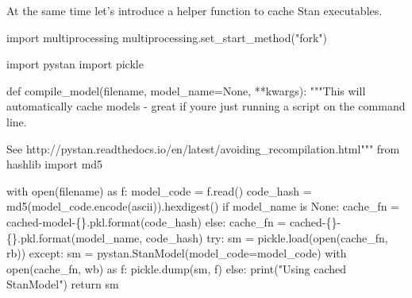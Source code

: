 \documentclass[
  letterpaper,
  DIV=11,
  numbers=noendperiod]{scrartcl}
\newenvironment{Shaded}{\begin{snugshade}}{\end{snugshade}}
\newcommand{\BuiltInTok}[1]{\textcolor[rgb]{0.00,0.23,0.31}{#1}}
\newcommand{\CommentTok}[1]{\textcolor[rgb]{0.37,0.37,0.37}{#1}}
\newcommand{\ControlFlowTok}[1]{\textcolor[rgb]{0.00,0.23,0.31}{#1}}
\newcommand{\ImportTok}[1]{\textcolor[rgb]{0.00,0.46,0.62}{#1}}
\newcommand{\KeywordTok}[1]{\textcolor[rgb]{0.00,0.23,0.31}{#1}}
\newcommand{\NormalTok}[1]{\textcolor[rgb]{0.00,0.23,0.31}{#1}}
\newcommand{\OperatorTok}[1]{\textcolor[rgb]{0.37,0.37,0.37}{#1}}
\newcommand{\SpecialCharTok}[1]{\textcolor[rgb]{0.37,0.37,0.37}{#1}}
\newcommand{\StringTok}[1]{\textcolor[rgb]{0.13,0.47,0.30}{#1}}
\newcommand{\VariableTok}[1]{\textcolor[rgb]{0.07,0.07,0.07}{#1}}
\begin{document}
At the same time let's introduce a helper function to cache Stan
executables.

\begin{Shaded}
\begin{Highlighting}[]
\ImportTok{import}\NormalTok{ multiprocessing}
\NormalTok{multiprocessing.set\_start\_method(}\StringTok{"fork"}\NormalTok{)}

\ImportTok{import}\NormalTok{ pystan}
\ImportTok{import}\NormalTok{ pickle}

\KeywordTok{def}\NormalTok{ compile\_model(filename, model\_name}\OperatorTok{=}\VariableTok{None}\NormalTok{, }\OperatorTok{**}\NormalTok{kwargs):}
  \CommentTok{"""This will automatically cache models {-} great if you\textquotesingle{}re just running a}
\CommentTok{     script on the command line.}

\CommentTok{    See http://pystan.readthedocs.io/en/latest/avoiding\_recompilation.html"""}
  \ImportTok{from}\NormalTok{ hashlib }\ImportTok{import}\NormalTok{ md5}
  
  \ControlFlowTok{with} \BuiltInTok{open}\NormalTok{(filename) }\ImportTok{as}\NormalTok{ f:}
\NormalTok{    model\_code }\OperatorTok{=}\NormalTok{ f.read()}
\NormalTok{    code\_hash }\OperatorTok{=}\NormalTok{ md5(model\_code.encode(}\StringTok{\textquotesingle{}ascii\textquotesingle{}}\NormalTok{)).hexdigest()}
    \ControlFlowTok{if}\NormalTok{ model\_name }\KeywordTok{is} \VariableTok{None}\NormalTok{:}
\NormalTok{      cache\_fn }\OperatorTok{=} \StringTok{\textquotesingle{}cached{-}model{-}}\SpecialCharTok{\{\}}\StringTok{.pkl\textquotesingle{}}\NormalTok{.}\BuiltInTok{format}\NormalTok{(code\_hash)}
    \ControlFlowTok{else}\NormalTok{:}
\NormalTok{      cache\_fn }\OperatorTok{=} \StringTok{\textquotesingle{}cached{-}}\SpecialCharTok{\{\}}\StringTok{{-}}\SpecialCharTok{\{\}}\StringTok{.pkl\textquotesingle{}}\NormalTok{.}\BuiltInTok{format}\NormalTok{(model\_name, code\_hash) }
    \ControlFlowTok{try}\NormalTok{:}
\NormalTok{      sm }\OperatorTok{=}\NormalTok{ pickle.load(}\BuiltInTok{open}\NormalTok{(cache\_fn, }\StringTok{\textquotesingle{}rb\textquotesingle{}}\NormalTok{))}
    \ControlFlowTok{except}\NormalTok{:}
\NormalTok{      sm }\OperatorTok{=}\NormalTok{ pystan.StanModel(model\_code}\OperatorTok{=}\NormalTok{model\_code)}
      \ControlFlowTok{with} \BuiltInTok{open}\NormalTok{(cache\_fn, }\StringTok{\textquotesingle{}wb\textquotesingle{}}\NormalTok{) }\ImportTok{as}\NormalTok{ f:}
\NormalTok{        pickle.dump(sm, f)}
    \ControlFlowTok{else}\NormalTok{:}
       \BuiltInTok{print}\NormalTok{(}\StringTok{"Using cached StanModel"}\NormalTok{)}
    \ControlFlowTok{return}\NormalTok{ sm}
\end{Highlighting}
\end{Shaded}
\end{document}
